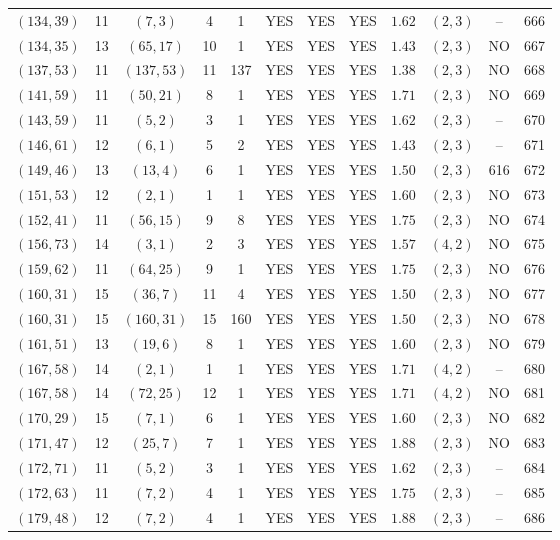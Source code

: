 \begin{longtable}{|c|c|c|c|c|c|c|c|c|c|c|c|}
$(134,39)$ & 11 & $(7,3)$ & 4 & 1 & YES & YES & YES & $1.62$ & $(2,3)$ & -- & 666\\
$(134,35)$ & 13 & $(65,17)$ & 10 & 1 & YES & YES & YES & $1.43$ & $(2,3)$ & NO & 667\\
$(137,53)$ & 11 & $(137,53)$ & 11 & 137 & YES & YES & YES & $1.38$ & $(2,3)$ & NO & 668\\
$(141,59)$ & 11 & $(50,21)$ & 8 & 1 & YES & YES & YES & $1.71$ & $(2,3)$ & NO & 669\\
$(143,59)$ & 11 & $(5,2)$ & 3 & 1 & YES & YES & YES & $1.62$ & $(2,3)$ & -- & 670\\
$(146,61)$ & 12 & $(6,1)$ & 5 & 2 & YES & YES & YES & $1.43$ & $(2,3)$ & -- & 671\\
$(149,46)$ & 13 & $(13,4)$ & 6 & 1 & YES & YES & YES & $1.50$ & $(2,3)$ & 616 & 672\\
$(151,53)$ & 12 & $(2,1)$ & 1 & 1 & YES & YES & YES & $1.60$ & $(2,3)$ & NO & 673\\
$(152,41)$ & 11 & $(56,15)$ & 9 & 8 & YES & YES & YES & $1.75$ & $(2,3)$ & NO & 674\\
$(156,73)$ & 14 & $(3,1)$ & 2 & 3 & YES & YES & YES & $1.57$ & $(4,2)$ & NO & 675\\
$(159,62)$ & 11 & $(64,25)$ & 9 & 1 & YES & YES & YES & $1.75$ & $(2,3)$ & NO & 676\\
$(160,31)$ & 15 & $(36,7)$ & 11 & 4 & YES & YES & YES & $1.50$ & $(2,3)$ & NO & 677\\
$(160,31)$ & 15 & $(160,31)$ & 15 & 160 & YES & YES & YES & $1.50$ & $(2,3)$ & NO & 678\\
$(161,51)$ & 13 & $(19,6)$ & 8 & 1 & YES & YES & YES & $1.60$ & $(2,3)$ & NO & 679\\
$(167,58)$ & 14 & $(2,1)$ & 1 & 1 & YES & YES & YES & $1.71$ & $(4,2)$ & -- & 680\\
$(167,58)$ & 14 & $(72,25)$ & 12 & 1 & YES & YES & YES & $1.71$ & $(4,2)$ & NO & 681\\
$(170,29)$ & 15 & $(7,1)$ & 6 & 1 & YES & YES & YES & $1.60$ & $(2,3)$ & NO & 682\\
$(171,47)$ & 12 & $(25,7)$ & 7 & 1 & YES & YES & YES & $1.88$ & $(2,3)$ & NO & 683\\
$(172,71)$ & 11 & $(5,2)$ & 3 & 1 & YES & YES & YES & $1.62$ & $(2,3)$ & -- & 684\\
$(172,63)$ & 11 & $(7,2)$ & 4 & 1 & YES & YES & YES & $1.75$ & $(2,3)$ & -- & 685\\
$(179,48)$ & 12 & $(7,2)$ & 4 & 1 & YES & YES & YES & $1.88$ & $(2,3)$ & -- & 686\\

\end{longtable}
